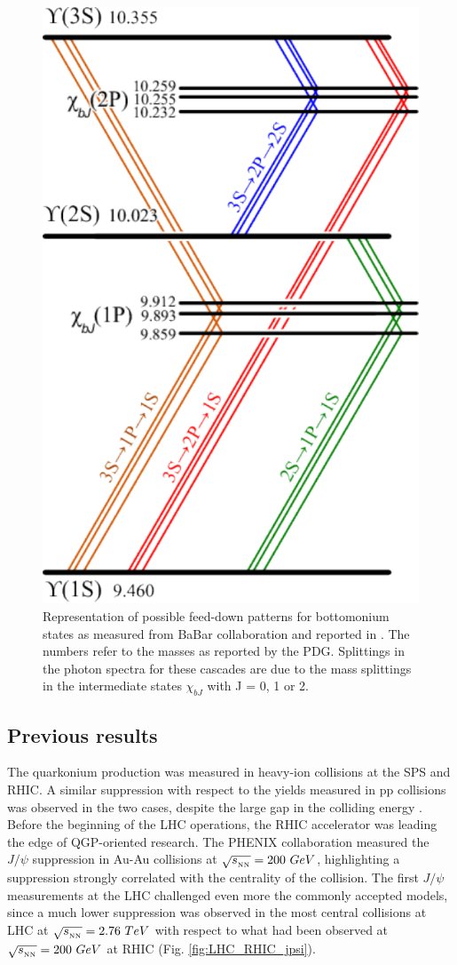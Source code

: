 \begin{figure}[!t]
\begin{center}
\includegraphics[width=0.45\linewidth]{Chapters/Analysis/Figs/BottomoniumSpectro.pdf}
\caption{Representation of possible feed-down patterns for bottomonium states as measured from BaBar collaboration and reported in \cite{Lees:2014qea}. The numbers refer to the masses as reported by the PDG. Splittings in the photon spectra for these cascades are due to the mass splittings in the intermediate states $\chi_{bJ}$ with J = 0, 1 or 2.}
\label{fig:BBSpectro}
\end{center}
\end{figure}

\subsection{Previous results}

The quarkonium production was measured in heavy-ion collisions at the SPS and RHIC. 
A similar suppression with respect to the yields measured in pp collisions was observed in the two cases, despite the large gap in the colliding energy \cite{Rapp:2017chc}.
Before the beginning of the LHC operations, the RHIC accelerator was leading the edge of QGP-oriented research.
The PHENIX collaboration measured the $J/\psi$ suppression in Au-Au collisions at $\sqrt{s_{_{\rm NN}}}=200\ GeV$, highlighting a suppression strongly correlated with the centrality of the collision.
The first $J/\psi$ measurements at the LHC challenged even more the commonly accepted models, since a much lower suppression was observed in the most central collisions at LHC at $\sqrt{s_{_{\rm NN}}}=2.76\ TeV$ with respect to what had been observed at $\sqrt{s_{_{\rm NN}}}=200\ GeV$ at RHIC (Fig. \ref{fig:LHC_RHIC_jpsi}).

